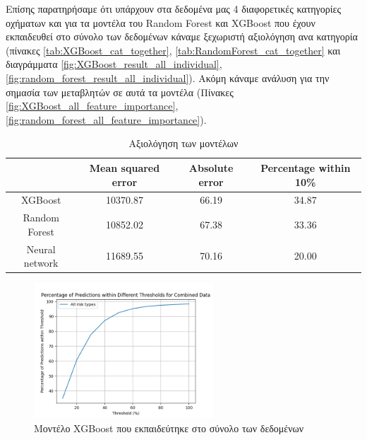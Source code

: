 \documentclass{llncs}
\begin{document}
Επίσης παρατηρήσαμε ότι υπάρχουν στα δεδομένα μας 4 διαφορετικές κατηγορίες οχήματων και
για τα μοντέλα του Random Forest και XGBoost που έχουν εκπαιδευθεί στο σύνολο των δεδομένων
κάναμε ξεχωριστή αξιολόγηση ανα κατηγορία 
(πίνακες \ref{tab:XGBoost_cat_together}, \ref{tab:RandomForest_cat_together} 
και διαγράμματα 
\ref{fig:XGBoost_result_all_individual}, \ref{fig:random_forest_result_all_individual}). Ακόμη κάναμε ανάλυση για την σημασία των μεταβλητών σε αυτά τα μοντέλα 
(Πίνακες \ref{fig:XGBoost_all_feature_importance}, 
\ref{fig:random_forest_all_feature_importance}).




\begin{table}
    \centering
    \begin{tabular}{|c|c|c|c|} %
        \hline
         &Mean squared error & Absolute error & Percentage within 10\% \\ %
        \hline
        XGBoost & 10370.87 & 66.19 & 34.87 \\
        Random Forest & 10852.02 & 67.38 & 33.36 \\
        Neural network & 11689.55 & 70.16 & 20.00 \\
        \hline
    \end{tabular}
    \caption{Αξιολόγηση των μοντέλων}
    \label{tab:3x3table}
\end{table}

\begin{figure}
    \begin{center}
        \includegraphics[width=0.6\textwidth]{images/combined_trained_all_thresholds_xgb.png}
    \end{center}
    \caption{Μοντέλο XGBoost που εκπαιδεύτηκε στο σύνολο των δεδομένων}  
    \label{fig:XGBoost_result}  
\end{figure}
\end{document}
